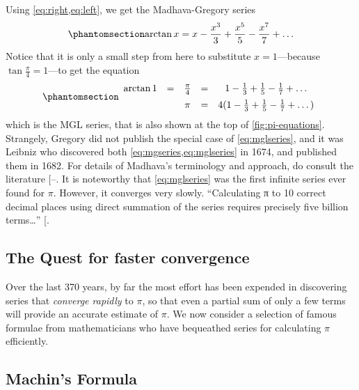 \documentclass[
  a4paper,
]{article}
\begin{document}
Using \cref{eq:right,eq:left}, we get the Madhava-Gregory series
\begin{equation}\phantomsection\label{eq:mgseries}{
\arctan x = x - \frac{x^3}{3} + \frac{x^5}{5} - \frac{x^7}{7} + \dots
}\end{equation} Notice that it is only a small step from here to
substitute \(x = 1\)---because \(\tan\frac{\pi}{4} = 1\)---to get the
equation \begin{equation}\phantomsection\label{eq:mglseries}{
\begin{array}{ccccc}
\arctan 1 & = & \frac{\pi}{4} & = & 1 - \frac{1}{3} + \frac{1}{5} - \frac{1}{7} + \dots \\[0.5em]
&  & \pi & = & 4(1 - \frac{1}{3} + \frac{1}{5} - \frac{1}{7} + \dots)
\end{array}
}\end{equation} which is the MGL series, that is also shown at the top
of \cref{fig:pi-equations}. Strangely, Gregory did not publish the
special case of \cref{eq:mglseries}, and it was Leibniz who discovered
both \cref{eq:mgseries,eq:mglseries} in 1674, and published them in
1682. For details of Madhava's terminology and approach, do consult the
literature
{[}--\citeproc{ref-joseph2011}{20}{]}. It is
noteworthy that \cref{eq:mglseries} was the first infinite series ever
found for \(\pi\). However, it converges very slowly. ``Calculating π to
10 correct decimal places using direct summation of the series requires
precisely five billion terms\ldots{}''
{[}\citeproc{ref-leibniz-pi}{22}{]}.

\subsection{The Quest for faster
convergence}\label{the-quest-for-faster-convergence}

Over the last 370 years, by far the most effort has been expended in
discovering series that \emph{converge rapidly} to \(\pi\), so that even
a partial sum of only a few terms will provide an accurate estimate of
\(\pi\). We now consider a selection of famous formulae from
mathematicians who have bequeathed series for calculating \(\pi\)
efficiently.

\subsection{Machin's Formula}\label{machins-formula}
\end{document}
